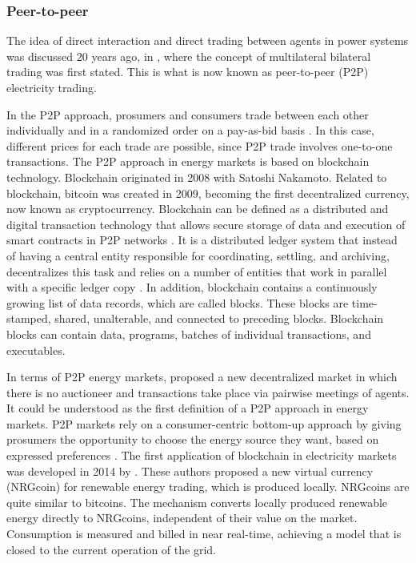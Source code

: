 \subsubsection{Peer-to-peer}
The idea of direct interaction and direct trading between agents in power systems was discussed 20 years ago, in \cite{wu1999coordinated}, where the concept of multilateral bilateral trading was first stated. This is what is now known as peer-to-peer (P2P) electricity trading.

In the P2P approach, prosumers and consumers trade between each other individually and in a randomized order on a pay-as-bid basis \cite{mengelkamp2018blockchain}. In this case, different prices for each trade are possible, since P2P trade involves one-to-one transactions. The P2P approach in energy markets is based on blockchain technology. Blockchain originated in 2008 with Satoshi Nakamoto. Related to blockchain, bitcoin was created in 2009, becoming the first decentralized currency, now known as cryptocurrency. Blockchain can be defined as a distributed and digital transaction technology that allows secure storage of data and execution of smart contracts in P2P networks \cite{swan2015blockchain}. It is a distributed ledger system that instead of having a central entity responsible for coordinating, settling, and archiving, decentralizes this task and relies on a number of entities that work in parallel with a specific ledger copy \cite{Pinson2017}.
In addition, blockchain contains a continuously growing list of data records, which are called blocks. These blocks are time-stamped, shared, unalterable, and connected to preceding blocks. Blockchain blocks can contain data, programs, batches of individual transactions, and executables.

In terms of P2P energy markets, \cite{blouin2001decentralized} proposed a new decentralized market in which there is no auctioneer and transactions take place via pairwise meetings of agents. It could be understood as the first definition of a P2P approach in energy markets. P2P markets rely on a consumer-centric bottom-up approach by giving prosumers the opportunity to choose the energy source they want, based on expressed preferences \cite{sousa2018peer}. The first application of blockchain in electricity markets was developed in 2014 by \cite{mihaylov2014nrgcoin}. These authors proposed a new virtual currency (NRGcoin) for renewable energy trading, which is produced locally. NRGcoins are quite similar to bitcoins. The mechanism converts locally produced renewable energy directly to NRGcoins, independent of their value on the market. Consumption is measured and billed in near real-time, achieving a model that is closed to the current operation of the grid.

